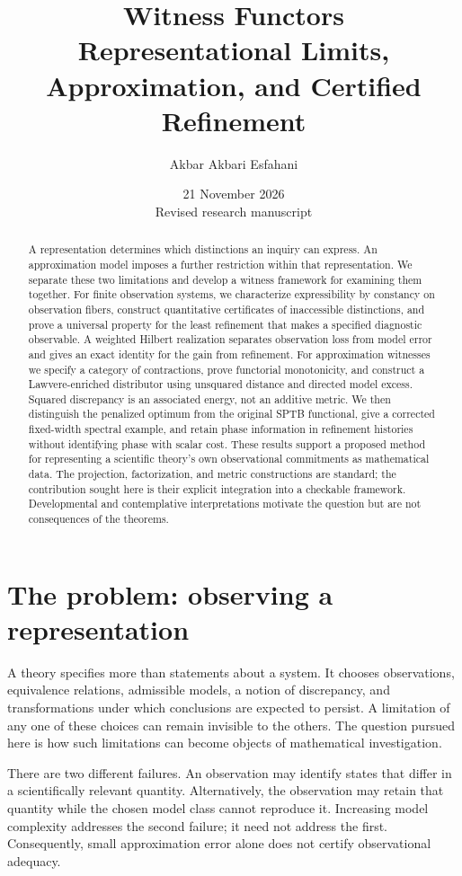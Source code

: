 \documentclass[11pt,letterpaper]{article}
\title{\textbf{Witness Functors}\\[3pt]\large Representational Limits, Approximation, and Certified Refinement}
\author{Akbar Akbari Esfahani}
\date{21 November 2026\\\small Revised research manuscript}
\begin{document}
\maketitle
\begin{abstract}
A representation determines which distinctions an inquiry can express. An approximation model imposes a further restriction within that representation. We separate these two limitations and develop a witness framework for examining them together. For finite observation systems, we characterize expressibility by constancy on observation fibers, construct quantitative certificates of inaccessible distinctions, and prove a universal property for the least refinement that makes a specified diagnostic observable. A weighted Hilbert realization separates observation loss from model error and gives an exact identity for the gain from refinement. For approximation witnesses we specify a category of contractions, prove functorial monotonicity, and construct a Lawvere-enriched distributor using unsquared distance and directed model excess. Squared discrepancy is an associated energy, not an additive metric. We then distinguish the penalized optimum from the original SPTB functional, give a corrected fixed-width spectral example, and retain phase information in refinement histories without identifying phase with scalar cost. These results support a proposed method for representing a scientific theory's own observational commitments as mathematical data. The projection, factorization, and metric constructions are standard; the contribution sought here is their explicit integration into a checkable framework. Developmental and contemplative interpretations motivate the question but are not consequences of the theorems.
\end{abstract}
\tableofcontents

\section{The problem: observing a representation}
A theory specifies more than statements about a system. It chooses observations, equivalence relations, admissible models, a notion of discrepancy, and transformations under which conclusions are expected to persist. A limitation of any one of these choices can remain invisible to the others. The question pursued here is how such limitations can become objects of mathematical investigation.

There are two different failures. An observation may identify states that differ in a scientifically relevant quantity. Alternatively, the observation may retain that quantity while the chosen model class cannot reproduce it. Increasing model complexity addresses the second failure; it need not address the first. Consequently, small approximation error alone does not certify observational adequacy.
\end{document}
